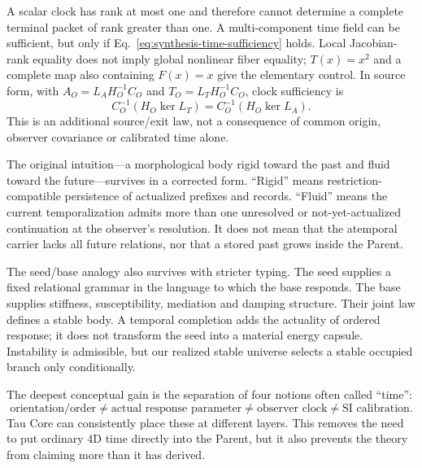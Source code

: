 \documentclass[11pt]{article}
\begin{document}
A scalar clock has rank at most one and therefore cannot determine a complete
terminal packet of rank greater than one. A multi-component time field can be
sufficient, but only if Eq.~\eqref{eq:synthesis-time-sufficiency} holds.
Local Jacobian-rank equality does not imply global nonlinear fiber equality;
$T(x)=x^2$ and a complete map also containing $F(x)=x$ give the elementary
control. In source form, with $A_O=L_AH_O^{-1}C_O$ and
$T_O=L_TH_O^{-1}C_O$, clock sufficiency is
\begin{equation}
 C_O^{-1}(H_O\ker L_T)=C_O^{-1}(H_O\ker L_A).
 \label{eq:synthesis-time-source-sufficiency}
\end{equation}
This is an additional source/exit law, not a consequence of common origin,
observer covariance or calibrated time alone.

The original intuition---a morphological body rigid toward the past and
fluid toward the future---survives in a corrected form.  ``Rigid'' means
restriction-compatible persistence of actualized prefixes and records.
``Fluid'' means the current temporalization admits more than one unresolved or
not-yet-actualized continuation at the observer's resolution.  It does not
mean that the atemporal carrier lacks all future relations, nor that a stored
past grows inside the Parent.

The seed/base analogy also survives with stricter typing.  The seed supplies
a fixed relational grammar in the language to which the base responds.  The
base supplies stiffness, susceptibility, mediation and damping structure.
Their joint law defines a stable body.  A temporal completion adds the
actuality of ordered response; it does not transform the seed into a material
energy capsule.  Instability is admissible, but our realized stable universe
selects a stable occupied branch only conditionally.

The deepest conceptual gain is the separation of four notions often called
``time'':
\begin{equation}
 \boxed{
 \text{orientation/order}
 \ne \text{actual response parameter}
 \ne \text{observer clock}
 \ne \text{SI calibration}.}
 \label{eq:four-times}
\end{equation}
Tau Core can consistently place these at different layers.  This removes the
need to put ordinary 4D time directly into the Parent, but it also prevents
the theory from claiming more than it has derived.
\end{document}
